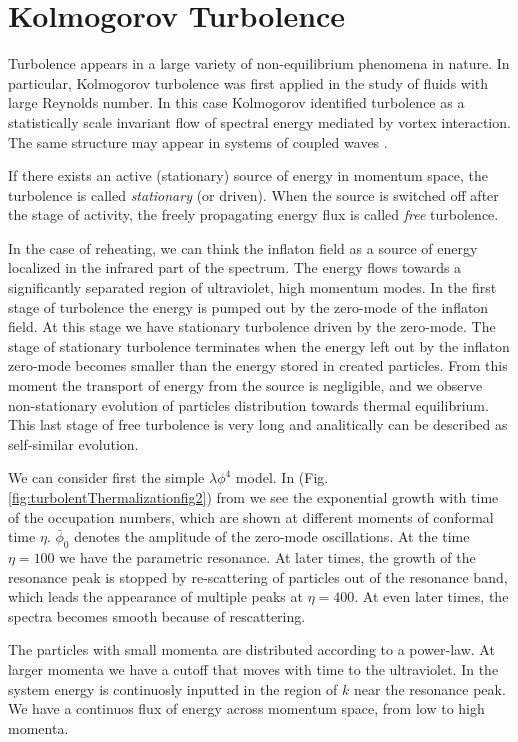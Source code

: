 \documentclass[11pt,a4paper,twoside]{book}
\begin{document}
\section{Kolmogorov Turbolence}
Turbolence appears in a large variety of non-equilibrium phenomena in nature. In particular, Kolmogorov turbolence was first applied in the study of fluids with large Reynolds number. In this case Kolmogorov identified turbolence as a statistically scale invariant flow of spectral energy mediated by vortex interaction. The same structure may appear in systems of coupled waves \cite{Chap6:turbolence}.

If there exists an active (stationary) source of energy in momentum space, the turbolence is called \textit{stationary} (or driven). When the source is switched off after the stage of activity, the freely propagating energy flux is called \textit{free} turbolence.

In the case of reheating, we can think the inflaton field as a source of energy localized in the infrared part of the spectrum. The energy flows towards a significantly separated region of ultraviolet, high momentum modes. In the first stage of turbolence the energy is pumped out by the zero-mode of the inflaton field. At this stage we have stationary turbolence driven by the zero-mode. The stage of stationary turbolence terminates when the energy left out by the inflaton zero-mode becomes smaller than the energy stored in created particles. From this moment the transport of energy from the source is negligible, and we observe non-stationary evolution of particles distribution towards thermal equilibrium. This last stage of free turbolence is very long and analitically can be described as self-similar evolution.

We can consider first the simple $ \lambda \phi^{4} $ model. In  (Fig. \ref{fig:turbolentThermalizationfig2}) from \cite{Chap6:TurbolentThermalization} we see the exponential growth with time of the occupation numbers, which are shown at different moments of conformal time $\eta$.  $\bar{\phi}_{0}$ denotes the amplitude of the zero-mode oscillations. At the time $\eta = 100$ we have the parametric resonance. At later times, the growth of the resonance peak is stopped by re-scattering of particles out of the resonance band, which leads the appearance of multiple peaks at $ \eta=400 $. At even later times, the spectra becomes smooth because of rescattering.

The particles with small momenta are distributed according to a power-law. At larger momenta  we have a cutoff that moves with time to the ultraviolet. In the system energy is continuosly inputted in the region of $ k $ near the resonance peak. We have a continuos flux of energy across momentum space, from low to high momenta.
\end{document}
